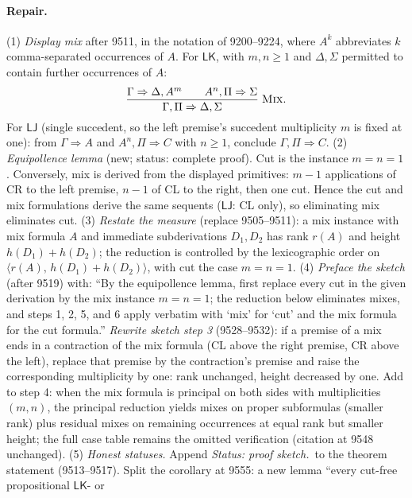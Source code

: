 \paragraph{Repair.} (1) \emph{Display mix} after 9511, in the notation of
9200--9224, where \(A^{k}\) abbreviates \(k\) comma-separated occurrences
of \(A\).  For \(\mathsf{LK}\), with \(m,n\ge 1\) and \(\Delta,\Sigma\)
permitted to contain further occurrences of \(A\):
\[
  \frac{\Gamma\Rightarrow\Delta,A^{m}\qquad A^{n},\Pi\Rightarrow\Sigma}
       {\Gamma,\Pi\Rightarrow\Delta,\Sigma}\;\textsc{Mix}.
\]
For \(\mathsf{LJ}\) (single succedent, so the left premise's succedent
multiplicity \(m\) is fixed at one): from \(\Gamma\Rightarrow A\) and
\(A^{n},\Pi\Rightarrow C\) with \(n\ge1\),
conclude \(\Gamma,\Pi\Rightarrow C\).
(2) \emph{Equipollence lemma} (new; status: complete proof).  Cut is the
instance \(m=n=1\).  Conversely, mix is derived from the displayed
primitives: \(m-1\) applications of \textsc{CR} to the left premise,
\(n-1\) of \textsc{CL} to the right, then one cut.  Hence the cut and mix
formulations derive the same sequents (\(\mathsf{LJ}\): \textsc{CL} only),
so eliminating mix eliminates cut.
(3) \emph{Restate the measure} (replace 9505--9511): a mix instance with
mix formula \(A\) and immediate subderivations \(D_1,D_2\) has rank
\(r(A)\) and height \(h(D_1)+h(D_2)\); the reduction is controlled by the
lexicographic order on \(\langle r(A),\,h(D_1)+h(D_2)\rangle\), with cut
the case \(m=n=1\).
(4) \emph{Preface the sketch} (after 9519) with: ``By the equipollence
lemma, first replace every cut in the given derivation by the mix instance
\(m=n=1\); the reduction below eliminates mixes, and steps 1, 2, 5, and 6
apply verbatim with `mix' for `cut' and the mix formula for the cut
formula.''  \emph{Rewrite sketch step 3} (9528--9532): if a premise of a mix ends
in a contraction of the mix formula (\textsc{CL} above the right premise,
\textsc{CR} above the left), replace that premise by the contraction's
premise and raise the corresponding multiplicity by one: rank unchanged,
height decreased by one.  Add to step 4: when the mix formula is principal
on both sides with multiplicities \((m,n)\), the principal reduction yields
mixes on proper subformulas (smaller rank) plus residual mixes on remaining
occurrences at equal rank but smaller height; the full case table remains
the omitted verification (citation at 9548 unchanged).
(5) \emph{Honest statuses.}  Append \textit{Status: proof sketch.}\ to the
theorem statement (9513--9517).  Split the corollary at 9555: a new lemma
``every cut-free propositional \(\mathsf{LK}\)- or
